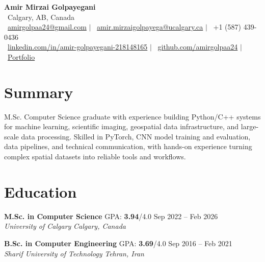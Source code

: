 \documentclass[a4paper,10pt]{article}
\newcommand{\resumeEducationSubheading}[5]{
    \textbf{#1} \hfill #2 \hfill #3 \\
    \textit{#4} \hfill \textit{#5}
}
\begin{document}

\begin{center}
    {\LARGE \textbf{Amir Mirzai Golpayegani}} \\[0.25em]
    \faMapMarker*~Calgary, AB, Canada \\[0.25em]
    \faEnvelope~\href{mailto:amirgolpaa24@gmail.com}{amirgolpaa24@gmail.com}
    $|$
    \faEnvelope~\href{mailto:amir.mirzaigolpayega@ucalgary.ca}{amir.mirzaigolpayega@ucalgary.ca}
    $|$
    \faPhone*~+1 (587) 439-0436 \\[0.25em]
    \faLinkedin~\href{https://linkedin.com/in/amir-golpayegani-218148165}{linkedin.com/in/amir-golpayegani-218148165}
    $|$
    \faGithub~\href{https://github.com/amirgolpaa24}{github.com/amirgolpaa24}
    $|$
    \faGlobe~\href{https://amir-portfolio-navy.vercel.app/}{Portfolio}
\end{center}


\section*{Summary}

M.Sc. Computer Science graduate with experience building Python/C++ systems for machine learning, scientific imaging, geospatial data infrastructure, and large-scale data processing. Skilled in PyTorch, CNN model training and evaluation, data pipelines, and technical communication, with hands-on experience turning complex spatial datasets into reliable tools and workflows.


\section*{Education}

\resumeEducationSubheading
{M.Sc. in Computer Science}
{GPA: \textbf{3.94}/4.0}
{Sep 2022 -- Feb 2026}
{University of Calgary}
{Calgary, Canada}

\vspace{0.35em}

\resumeEducationSubheading
{B.Sc. in Computer Engineering}
{GPA: \textbf{3.69}/4.0}
{Sep 2016 -- Feb 2021}
{Sharif University of Technology}
{Tehran, Iran}

\end{document}
